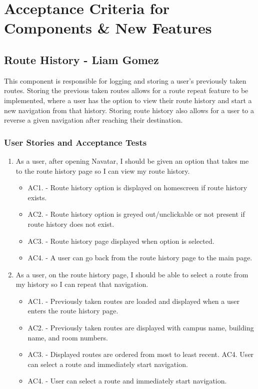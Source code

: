 \documentclass{scrreprt}
\begin{document}
\chapter{Acceptance Criteria for Components \& New Features}

\section{Route History - Liam Gomez}

This component is responsible for logging and storing a user’s previously taken routes. Storing the previous taken routes allows for a route repeat feature to be implemented, where a user has the option to view their route history and start a new navigation from that history. Storing route history also allows for a user to a reverse a given navigation after reaching their destination.


\subsection{User Stories and Acceptance Tests}
\begin{enumerate}
	\item As a user, after opening Navatar, I should be given an option that takes me to the route history page so I can view my route history.
	
		\begin{itemize}
			\item AC1. - Route history option is displayed on homescreen if route history exists.
			
			\item AC2. - Route history option is greyed out/unclickable or not present if route history does not exist.

			\item AC3. - Route history page displayed when option is selected.

			\item AC4. - A user can go back from the route history page to the main page.

		\end{itemize}
	
	\item As a user, on the route history page, I should be able to select a route from my history so I can repeat that navigation.
	
		\begin{itemize}
			\item AC1. - Previously taken routes are loaded and displayed when a user enters the route history page.
			\item AC2. - Previously taken routes are displayed with campus name, building name, and room numbers.
			\item AC3. - Displayed routes are ordered from most to least recent.
AC4. User can select a route and immediately start navigation.
			\item AC4. - User can select a route and immediately start navigation.
		\end{itemize}
\end{enumerate}
\end{document}
